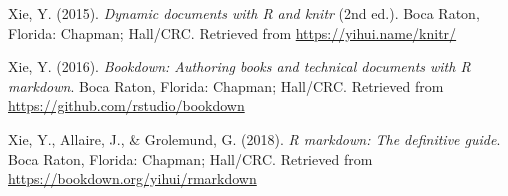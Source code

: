 \documentclass[british,,man,floatsintext]{apa6}
\begin{document}
\leavevmode\hypertarget{ref-R-knitr}{}%
Xie, Y. (2015). \emph{Dynamic documents with R and knitr} (2nd ed.). Boca Raton, Florida: Chapman; Hall/CRC. Retrieved from \url{https://yihui.name/knitr/}

\leavevmode\hypertarget{ref-R-bookdown}{}%
Xie, Y. (2016). \emph{Bookdown: Authoring books and technical documents with R markdown}. Boca Raton, Florida: Chapman; Hall/CRC. Retrieved from \url{https://github.com/rstudio/bookdown}

\leavevmode\hypertarget{ref-R-rmarkdown}{}%
Xie, Y., Allaire, J., \& Grolemund, G. (2018). \emph{R markdown: The definitive guide}. Boca Raton, Florida: Chapman; Hall/CRC. Retrieved from \url{https://bookdown.org/yihui/rmarkdown}
\end{document}
